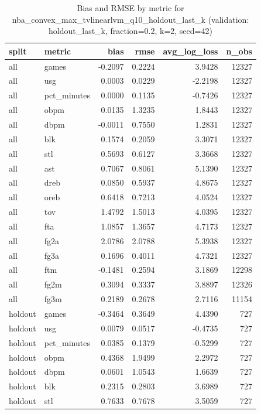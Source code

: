 \begin{table}
\caption{Bias and RMSE by metric for nba_convex_max_tvlinearlvm_q10_holdout_last_k (validation: holdout_last_k, fraction=0.2, k=2, seed=42)}
\label{tab:nba_convex_max_tvlinearlvm_q10_holdout_last_k_vs_holdout_last_k_f20_k2_s42_bias_rmse}
\begin{tabular}{llrrrr}
\toprule
split & metric & bias & rmse & avg\_log\_loss & n\_obs \\
\midrule
all & games & -0.2097 & 0.2224 & 3.9428 & 12327 \\
all & usg & 0.0003 & 0.0229 & -2.2198 & 12327 \\
all & pct\_minutes & 0.0000 & 0.1135 & -0.7426 & 12327 \\
all & obpm & 0.0135 & 1.3235 & 1.8443 & 12327 \\
all & dbpm & -0.0011 & 0.7550 & 1.2831 & 12327 \\
all & blk & 0.1574 & 0.2059 & 3.3071 & 12327 \\
all & stl & 0.5693 & 0.6127 & 3.3668 & 12327 \\
all & ast & 0.7067 & 0.8061 & 5.1390 & 12327 \\
all & dreb & 0.0850 & 0.5937 & 4.8675 & 12327 \\
all & oreb & 0.6418 & 0.7213 & 4.0524 & 12327 \\
all & tov & 1.4792 & 1.5013 & 4.0395 & 12327 \\
all & fta & 1.0857 & 1.3657 & 4.7173 & 12327 \\
all & fg2a & 2.0786 & 2.0788 & 5.3938 & 12327 \\
all & fg3a & 0.1696 & 0.4011 & 4.7321 & 12327 \\
all & ftm & -0.1481 & 0.2594 & 3.1869 & 12298 \\
all & fg2m & 0.3094 & 0.3337 & 3.8897 & 12326 \\
all & fg3m & 0.2189 & 0.2678 & 2.7116 & 11154 \\
holdout & games & -0.3464 & 0.3649 & 4.4390 & 727 \\
holdout & usg & 0.0079 & 0.0517 & -0.4735 & 727 \\
holdout & pct\_minutes & 0.0385 & 0.1379 & -0.5299 & 727 \\
holdout & obpm & 0.4368 & 1.9499 & 2.2972 & 727 \\
holdout & dbpm & 0.0601 & 1.0543 & 1.6639 & 727 \\
holdout & blk & 0.2315 & 0.2803 & 3.6989 & 727 \\
holdout & stl & 0.7633 & 0.7678 & 3.5059 & 727 \\

\end{tabular}
\end{table}
